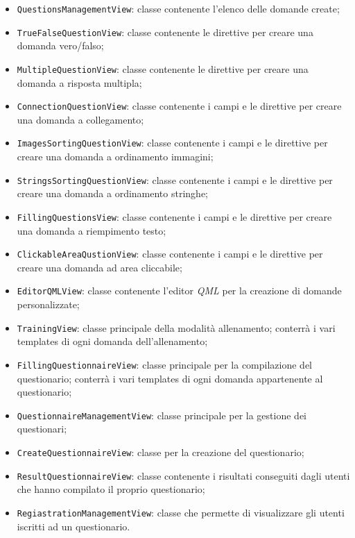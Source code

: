 \begin{itemize}
\begin{itemize}
		\item \texttt{QuestionsManagementView}: classe contenente l'elenco delle domande create;
		\item \texttt{TrueFalseQuestionView}: classe contenente le direttive per creare una domanda vero/falso;
		\item \texttt{MultipleQuestionView}: classe contenente le direttive per creare una domanda a risposta multipla;
		\item \texttt{ConnectionQuestionView}: classe contenente i campi e le direttive per creare una domanda a collegamento;
		\item \texttt{ImagesSortingQuestionView}: classe contenente i campi e le direttive per creare una domanda a ordinamento immagini;
		\item \texttt{StringsSortingQuestionView}: classe contenente i campi e le direttive per creare una domanda a ordinamento stringhe;
		\item \texttt{FillingQuestionsView}: classe contenente i campi e le direttive per creare una domanda a riempimento testo;
		\item \texttt{ClickableAreaQustionView}: classe contenente i campi e le direttive per creare una domanda ad area cliccabile;
		\item \texttt{EditorQMLView}: classe contenente l'editor \textit{QML} per la creazione di domande personalizzate;
		\item \texttt{TrainingView}: classe principale della modalità allenamento; conterrà i vari templates di ogni domanda dell'allenamento;
		\item \texttt{FillingQuestionnaireView}: classe principale per la compilazione del questionario; conterrà i vari templates di ogni domanda appartenente al questionario;
		\item \texttt{QuestionnaireManagementView}: classe principale per la gestione dei questionari;
		\item \texttt{CreateQuestionnaireView}: classe per la creazione del questionario;
		\item \texttt{ResultQuestionnaireView}: classe contenente i risultati conseguiti dagli utenti che hanno compilato il proprio questionario;
		\item \texttt{RegiastrationManagementView}: classe che permette di visualizzare gli utenti iscritti ad un questionario.
	\end{itemize}
\end{itemize}